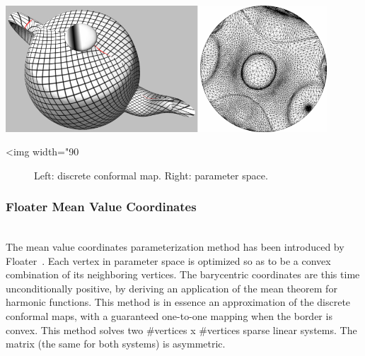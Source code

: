 \begin{center}
    \label{Surface_mesh_parameterization-fig-conformal}
    \begin{ccTexOnly}
        \includegraphics[width=0.9\textwidth]{Surface_mesh_parameterization/conformal}
    \end{ccTexOnly}
    \begin{ccHtmlOnly}
        <img width="90%
    \end{ccHtmlOnly}
    \begin{figure}[ht]
        \caption{Left: discrete conformal map. Right: parameter space.}
    \end{figure}
\end{center}

\subsubsection{Floater Mean Value Coordinates}

  \\

The mean value coordinates parameterization method has been introduced
by Floater~\cite{cgal:f-mvc-03}. Each vertex in parameter space is
optimized so as to be a convex combination of its neighboring
vertices. The barycentric coordinates are this time unconditionally
positive, by deriving an application of the mean theorem for harmonic
functions. This method is in essence an approximation of the discrete conformal
maps, with a guaranteed one-to-one mapping when the border is convex.
This method solves two \#vertices x \#vertices sparse linear systems. The matrix (the
same for both systems) is asymmetric.

